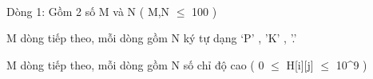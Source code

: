  

Dòng 1: Gồm 2 số M và N ( M,N  $\le$  100 )

M dòng tiếp theo, mỗi dòng gồm N ký tự dạng ‘P’ , ’K’ , ’.’

M dòng tiếp theo, mỗi dòng gồm N số chỉ độ cao ( 0  $\le$  H[i][j]  $\le$  10^9 )

 

 

 

\